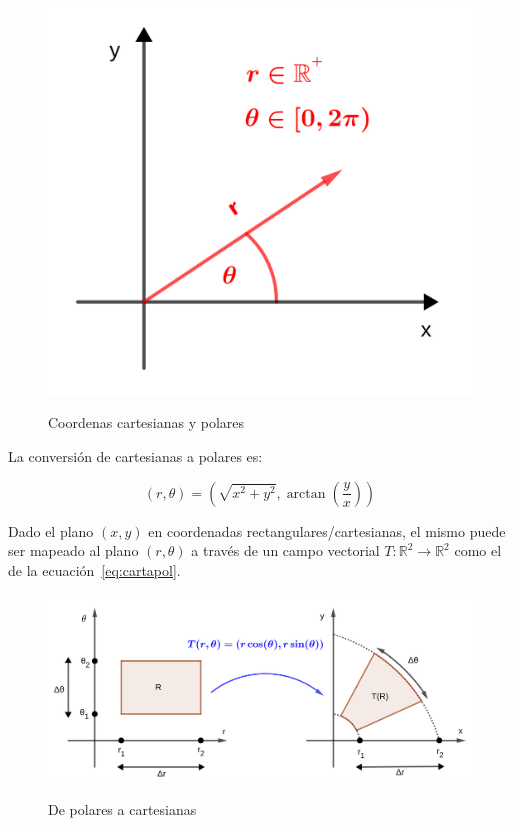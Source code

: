 \documentclass{article}
\renewcommand{\Bbb}{\mathbb}
\begin{document}
\begin{figure}[ht]
\centering
\caption{Coordenas cartesianas y polares}
\includegraphics[scale=0.8]{img/teo_fig029_cp.png}
\label{fig:cp}
\end{figure}

La conversión de cartesianas a polares es:

\begin{equation}
(r, \theta) = \left( \sqrt{x^2 + y^2}, \arctan \left( \frac{y}{x} \right) \right)
\label{eq:cartapol}
\end{equation}

Dado el plano $(x,y)$ en coordenadas rectangulares/cartesianas, el mismo puede ser mapeado al plano $(r, \theta)$ a través de un campo vectorial $T:\Bbb R^2 \rightarrow \Bbb R^2$ como el de la ecuación~\ref{eq:cartapol}.

\begin{figure}[ht]
\centering
\caption{De polares a cartesianas}
\includegraphics[scale=0.8]{img/teo_fig030_ccp.png}
\label{fig:polacart}
\end{figure}
\end{document}
